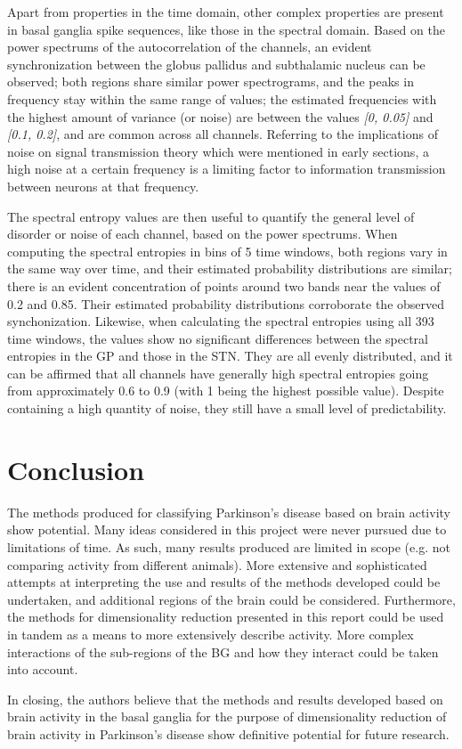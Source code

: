 \documentclass{kththesis}
\begin{document}
Apart from properties in the time domain, other complex properties are present in basal ganglia spike sequences, like those in the spectral domain. 
Based on the power spectrums of the autocorrelation of the channels, an evident synchronization between the globus pallidus and subthalamic nucleus can be observed; both regions share similar power spectrograms, and the peaks in frequency stay within the same range of values; the estimated frequencies with the highest amount of variance (or noise) are between the values \textit{[0, 0.05]} and \textit{[0.1, 0.2]}, and are common across all channels. 
Referring to the implications of noise on signal transmission theory which were mentioned in early sections, a high noise at a certain frequency is a limiting factor to information transmission between neurons at that frequency. 

The spectral entropy values are then useful to quantify the general level of disorder or noise of each channel, based on the power spectrums. 
When computing the spectral entropies in bins of 5 time windows, both regions vary in the same way over time, and their estimated probability distributions are similar; there is an evident concentration of points around two bands near the values of 0.2 and 0.85.
Their estimated probability distributions corroborate the observed synchonization. 
Likewise, when calculating the spectral entropies using all 393 time windows, the values show no significant differences between the spectral entropies in the GP and those in the STN. 
They are all evenly distributed, and it can be affirmed that all channels have generally high spectral entropies going from approximately 0.6 to 0.9 (with 1 being the highest possible value). 
Despite containing a high quantity of noise, they still have a small level of predictability. 


\newpage
\chapter{Conclusion}

The methods produced for classifying Parkinson's disease based on brain activity show potential.
Many ideas considered in this project were never pursued due to limitations of time. 
As such, many results produced are limited in scope (e.g. not comparing activity from different animals).
More extensive and sophisticated attempts at interpreting the use and results of the methods developed could be undertaken, and additional regions of the brain could be considered.
Furthermore, the methods for dimensionality reduction presented in this report could be used in tandem as a means to more extensively describe activity.
More complex interactions of the sub-regions of the BG and how they interact could be taken into account.

In closing, the authors believe that the methods and results developed based on brain activity in the basal ganglia for the purpose of dimensionality reduction of brain activity in Parkinson's disease show definitive potential for future research.

\newpage
\printbibliography[heading=bibintoc]
\end{document}
